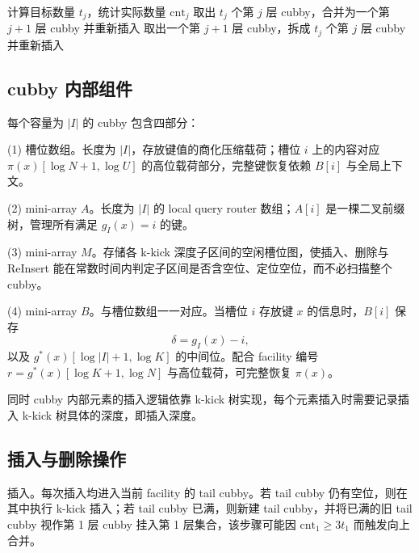 \begin{algorithm}[htbp]
  \caption{第 \(j\) 层 cubby 数量调度}
  \label{alg:tier-schedule}
  \begin{algorithmic}[1]
      \State 计算目标数量 \(t_j\)，统计实际数量 \(\mathrm{cnt}_j\)
        \State 取出 \(t_j\) 个第 \(j\) 层 cubby，合并为一个第 \(j+1\) 层 cubby 并重新插入
        \State 取出一个第 \(j+1\) 层 cubby，拆成 \(t_j\) 个第 \(j\) 层 cubby 并重新插入
      \EndIf
    \EndFor
  \end{algorithmic}
\end{algorithm}

\subsection{cubby 内部组件}

每个容量为 \(|I|\) 的 cubby 包含四部分：

(1) 槽位数组。长度为 \(|I|\)，存放键值的商化压缩载荷；槽位 \(i\) 上的内容对应 \(\pi(x)[\log N+1,\log U]\) 的高位载荷部分，完整键恢复依赖 \(B[i]\) 与全局上下文。

(2) mini-array \(A\)。长度为 \(|I|\) 的 local query router 数组；\(A[i]\) 是一棵二叉前缀树，管理所有满足 \(g_I(x)=i\) 的键。

(3) mini-array \(M\)。存储各 k-kick 深度子区间的空闲槽位图，使插入、删除与 ReInsert 能在常数时间内判定子区间是否含空位、定位空位，而不必扫描整个 cubby。

(4) mini-array \(B\)。与槽位数组一一对应。当槽位 \(i\) 存放键 \(x\) 的信息时，\(B[i]\) 保存
\begin{equation}
  \delta=g_I(x)-i,
\end{equation}
以及 \(g^\ast(x)[\log|I|+1,\log K]\) 的中间位。配合 facility 编号 \(r=g^\ast(x)[\log K+1,\log N]\) 与高位载荷，可完整恢复 \(\pi(x)\)\cite{bender2022otsh,pagh2008retrieval}。

同时 cubby 内部元素的插入逻辑依靠 k-kick 树实现，每个元素插入时需要记录插入 k-kick 树具体的深度，即插入深度。

\subsection{插入与删除操作}

插入。每次插入均进入当前 facility 的 tail cubby。若 tail cubby 仍有空位，则在其中执行 k-kick 插入；若 tail cubby 已满，则新建 tail cubby，并将已满的旧 tail cubby 视作第 1 层 cubby 挂入第 1 层集合，该步骤可能因 \(\mathrm{cnt}_1\ge 3t_1\) 而触发向上合并。

